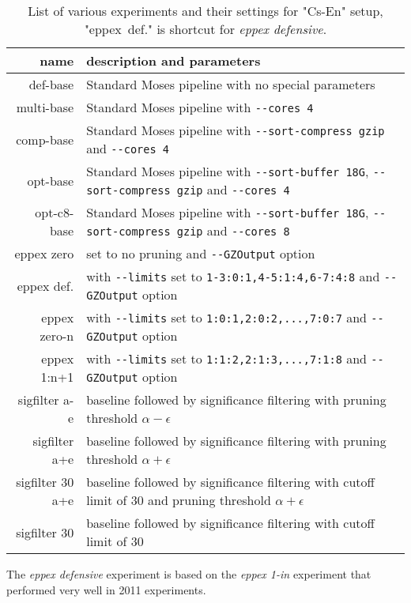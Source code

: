 \begin{table}[ht]
\centering
\begin{tabular}{ r p{10cm} }
name & description and parameters \\
\hline
\hline
def-base        & Standard Moses pipeline with no special parameters \\
multi-base      & Standard Moses pipeline with \verb|--cores 4| \\
comp-base       & Standard Moses pipeline with \verb|--sort-compress gzip| and \verb|--cores 4| \\
opt-base        & Standard Moses pipeline with \verb|--sort-buffer 18G|, \verb|--sort-compress gzip| and \verb|--cores 4| \\
opt-c8-base     & Standard Moses pipeline with \verb|--sort-buffer 18G|, \verb|--sort-compress gzip| and \verb|--cores 8| \\
\hline
eppex zero      & \eppex{} set to no pruning and \verb|--GZOutput| option \\
eppex def.      & \eppex{} with \verb|--limits| set to \verb|1-3:0:1,4-5:1:4,6-7:4:8| and \verb|--GZOutput| option \\
eppex zero-n    & \eppex{} with \verb|--limits| set to \verb|1:0:1,2:0:2,...,7:0:7| and \verb|--GZOutput| option \\
eppex 1:n+1     & \eppex{} with \verb|--limits| set to \verb|1:1:2,2:1:3,...,7:1:8| and \verb|--GZOutput| option \\
\hline
sigfilter a-e   & baseline followed by significance filtering with pruning threshold $\alpha - \epsilon$ \\
sigfilter a+e   & baseline followed by significance filtering with pruning threshold $\alpha + \epsilon$ \\
sigfilter 30 a+e  & baseline followed by significance filtering with cutoff limit of 30 and pruning threshold $\alpha + \epsilon$ \\
sigfilter 30    & baseline followed by significance filtering with cutoff limit of 30 \\
\hline
\hline
\end{tabular}
\caption{\label{cs-en-wmt13-scenarios}
List of various experiments and their settings for "Cs-En" setup, "eppex~def." is shortcut for \emph{eppex defensive}.}
\end{table}

The \emph{eppex defensive} experiment is based on the \emph{eppex 1-in} experiment that
performed very well in 2011 experiments.

